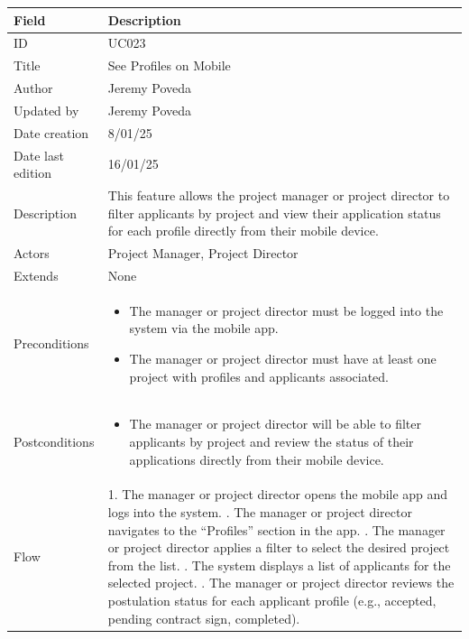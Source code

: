\documentclass{scrreprt}
\begin{document}
\begin{table}[H]
	\centering
	\begin{tabular}{|p{3cm}|p{10cm}|}
		\hline
		\textbf{Field} & \textbf{Description} \\ \hline
		ID & UC023 \\ \hline
		Title & See Profiles on Mobile \\ \hline
		Author & Jeremy Poveda \\ \hline
		Updated by & Jeremy Poveda \\ \hline
		Date creation & 8/01/25 \\ \hline
		Date last edition & 16/01/25 \\ \hline
		Description & 
		This feature allows the project manager or project director to filter applicants by project and view their application status for each profile directly from their mobile device. \\ \hline
		Actors & Project Manager, Project Director \\ \hline
		Extends & None \\ \hline
		Preconditions & 
		\begin{itemize}
			\item The manager or project director must be logged into the system via the mobile app.
			\item The manager or project director must have at least one project with profiles and applicants associated.
		\end{itemize} \\ \hline
		Postconditions & 
		\begin{itemize}
			\item The manager or project director will be able to filter applicants by project and review the status of their applications directly from their mobile device.
		\end{itemize} \\ \hline
		Flow & 
		1. The manager or project director opens the mobile app and logs into the system. \newline
		2. The manager or project director navigates to the “Profiles” section in the app. \newline
		3. The manager or project director applies a filter to select the desired project from the list. \newline
		4. The system displays a list of applicants for the selected project. \newline
		5. The manager or project director reviews the postulation status for each applicant profile (e.g., accepted, pending contract sign, completed). \\ \hline

\end{tabular}
\end{table}
\end{document}

